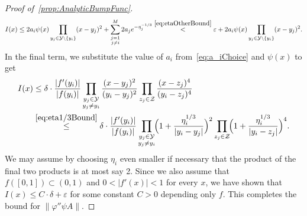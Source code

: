 \documentclass[12pt,]{article}
\theoremstyle{definition}
\theoremstyle{remark}
\newcommand{\0}{\mathbf{0}}
\begin{document}
{\begin{proof}[Proof of~\cref{prop:AnalyticBumpFunc}]
\begin{equation*}
	I(x) \leq 2a_i \psi(x) \prod_{y_j\in\mathcal{Y}\setminus\{y_i\}} (x-y_j)^2 + \sum_{\substack{j=1 \\ j\neq i}}^{M} 2a_j e^{-\eta_j^{-1/3}} \stackrel{\eqref{eq:etaOtherBound}}{<} \varepsilon + 2a_i \psi(x) \prod_{y_j\in\mathcal{Y}\setminus\{y_i\}} (x-y_j)^2.
\end{equation*}
In the final term, we substitute the value of $a_i$ from~\cref{eq:a_iChoice} and $\psi(x)$ to get
\begin{align*}
	I(x)&\leq \delta \cdot \frac{|f'(y_i)|}{|f(y_i)|} \prod_{\substack{y_j\in\mathcal{Y} \\ y_j\neq y_i}} \frac{(x-y_j)^2}{(y_i - y_j)^2}  \prod_{z_j\in\mathcal{Z}} \frac{(x-z_j)^4}{(y_i - z_j)^4} \\
	&\stackrel{\eqref{eq:eta1/3Bound}}{\leq}  \delta \cdot \frac{|f'(y_i)|}{|f(y_i)|}\prod_{\substack{y_j\in\mathcal{Y} \\ y_j\neq y_i}}\!\! \Big( 1+\frac{\eta_i^{1/3}}{|y_i-y_j|} \Big)^2 \prod_{z_j\in\mathcal{Z}}\!\! \Big( 1+\frac{\eta_i^{1/3}}{|y_i-z_j|} \Big)^4. 
\end{align*}
We may assume by choosing $\eta_i$ even smaller if necessary that the product of the final two products is at most say 2. Since we also assume that $f([0,1])\subset (0,1)$ and $0<|f'(x)|<1$ for every $x$, we have shown that $I(x)\leq C\cdot\delta+\varepsilon$ for some constant $C>0$ depending only $f$. This completes the bound for $\| \varphi'' \psi A\|$. 
\end{proof}

\begin{comment}"Old proof, really the same, just got slightly restructured"
\begin{proof}[Proof of~\cref{prop:AnalyticBumpFunc}]
The argument is essentially a careful analysis of the function $g$ defined in~\cref{eq:BumpFunc} with the choice 
\begin{equation}\label{eq:a_iChoice}
a_i = \frac{\delta \cdot |f'(y_i)|}{2  \cdot |f(y_i)|} \Big(\prod_{y_j\in\mathcal{Y}\setminus\{y_i\}} (y_i - y_j)^2 \cdot \prod_{z_j\in\mathcal{Z}} (y_i - z_j)^4 \Big)^{-1}
\end{equation}
and 
\begin{equation}\label{eq:eta_iBound1}
\eta_i\leq \min\bigg\{ \underbrace{\frac{\varepsilon \cdot C(2,0)}{M a_i}}_{(C1)},\; \underbrace{\Big(\frac{\varepsilon e^{1/2}\sqrt{2}}{2M^2 a_i}\Big)^2}_{(C2)},\; \underbrace{\frac{\varepsilon e}{4QMa_i}}_{(C3)},\; \underbrace{\Big( \frac{\varepsilon (2e/3)^{3/2} }{2 Ma_i} \Big)^2}_{(C4)} \bigg\}
\end{equation}
for every $i=1,\ldots,M$. We will make further compatible restrictions on $\eta_i$ later in the proof.


\end{comment}}
\end{document}

